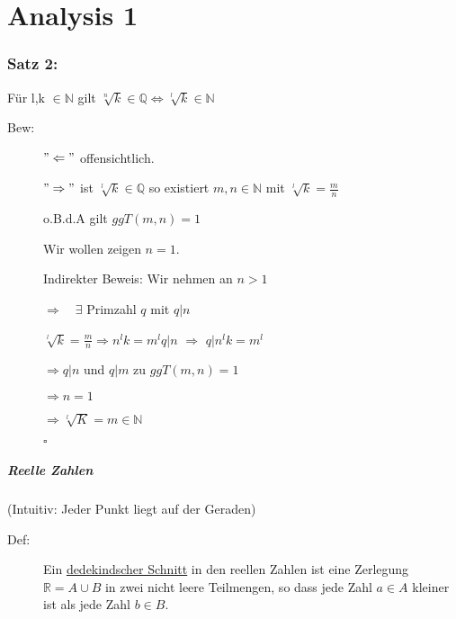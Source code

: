 \documentclass[12pt,a4paper,leqno]{article}
\author{Rüdiger Brecht, Martin Dreher}
\begin{document}
  \part*{Analysis 1}
  
  
  \section*{Satz 2:} 
  
  Für l,k $ \in \mathbb{N} $ gilt $\sqrt[n]{k}\in \mathbb{Q} \Leftrightarrow \sqrt[l]{k}\in \mathbb{N}$
  
  
  \begin{description}
    \item[Bew:] $"\Leftarrow "$ offensichtlich.
      
      $" \Rightarrow "$ ist $\sqrt[l]{k} \in \mathbb{Q}$ so existiert $m,n \in \mathbb{N}$ mit $\sqrt[l]{k}=\frac{m}{n}$ 
      
      
      o.B.d.A gilt $ggT(m,n)=1$ 
      
      Wir wollen zeigen $n=1$.
      
      Indirekter Beweis: Wir nehmen an $n>1$
      
      $\Rightarrow \quad \exists$ Primzahl $q$ mit $q|n$
      
      $\sqrt[l]{k}=\frac{m}{n}\Rightarrow n^{l}k=m^{l}
      q|n$ $\Rightarrow$ $q|n^{l}k = m^{l}$
      
      $\Rightarrow q|n$ und $q|m $ \blitze zu $ggT(m,n)=1$
      
      $\Rightarrow n=1$
      
      $\Rightarrow \sqrt[l]{K}=m \in \mathbb{N} $
      \begin{flushright} $ \square $ \end{flushright}
  \end{description}
  
  
  \subsubsection*{Reelle Zahlen}
  
  (Intuitiv: Jeder Punkt liegt auf der Geraden)
  
  \begin{description}
    \item[Def:] Ein \underline{dedekindscher Schnitt} in den reellen Zahlen ist eine Zerlegung $\mathbb{R} = A \cup B$ in zwei nicht leere Teilmengen, so dass jede Zahl $a \in A$ kleiner ist als jede Zahl $b \in B$.
  \end{description}
  
\end{document}
